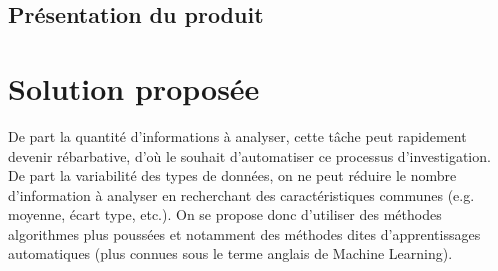 \subsection{Présentation du produit}
\label{Introduction:Expression du besoin:Présentation du produit}

\section{Solution proposée}
De part la quantité d'informations à analyser, cette tâche peut rapidement devenir rébarbative, d'où le souhait d'automatiser ce processus d'investigation. De part la variabilité des types de données, on ne peut réduire le nombre d'information à analyser en recherchant des caractéristiques communes (e.g. moyenne, écart type, etc.). On se propose donc d'utiliser des méthodes algorithmes plus poussées  et notamment des méthodes dites  d'apprentissages automatiques (plus connues sous le terme anglais de Machine Learning). 